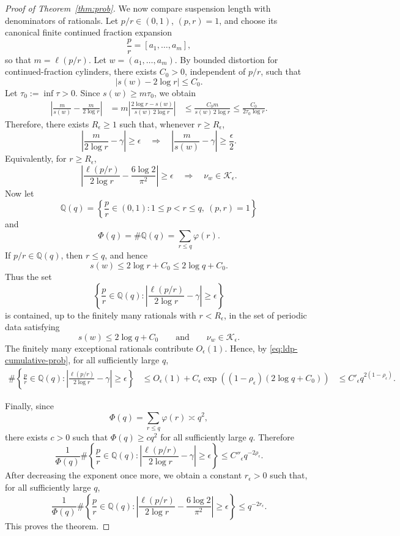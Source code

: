 \documentclass[letterpaper,11pt]{amsart}
\numberwithin{equation}{section}     %
\def\Q{{\mathbb Q}}
\def\le{\leqslant}
\def\ge{\geqslant}
\begin{document}
\begin{proof}[Proof of Theorem~\ref{thm:prob}]
We now compare suspension length with denominators of rationals. Let
\(p/r\in(0,1)\), \((p,r)=1\), and choose its canonical finite continued
fraction expansion
\[
\frac pr=[a_1,\ldots,a_m],
\]
so that \(m=\ell(p/r)\). Let \(w=(a_1,\ldots,a_m)\). By bounded distortion for
continued-fraction cylinders, there exists \(C_0>0\), independent of \(p/r\),
such that
\begin{equation}\label{eq:susp-denom-comparison}
\left|s(w)-2\log r\right|\le C_0 .
\end{equation}
Let $\tau_0:=\inf\tau>0.$ Since $s(w)\ge m\tau_0$, we obtain
\[
\begin{aligned}
\left|
\frac{m}{s(w)}
-
\frac{m}{2\log r}
\right|
&=
m
\left|
\frac{2\log r-s(w)}{s(w)\,2\log r}
\right|  
&\le
\frac{C_0m}{s(w)\,2\log r}
\le
\frac{C_0}{2\tau_0\log r}.
\end{aligned}
\]
Therefore, there exists \(R_\epsilon\ge1\) such that, whenever
\(r\ge R_\epsilon\),
\[
\left|
\frac{m}{2\log r}-\gamma
\right|
\ge \epsilon
\quad\Longrightarrow\quad
\left|
\frac{m}{s(w)}-\gamma
\right|
\ge \frac{\epsilon}{2}.
\]
Equivalently, for \(r\ge R_\epsilon\),
\[
\left|
\frac{\ell(p/r)}{2\log r}
-
\frac{6\log 2}{\pi^2}
\right|
\ge \epsilon
\quad\Longrightarrow\quad
\nu_w\in\mathcal K_\epsilon .
\]
Now let
\[
\Q(q)
=
\left\{
\frac pr\in(0,1):
1\le p<r\le q,\ (p,r)=1
\right\}
\]
and
\[
\Phi(q)=\#\Q(q)=\sum_{r\le q}\varphi(r).
\]
If \(p/r\in\Q(q)\), then \(r\le q\), and hence
\[
s(w)\le 2\log r+C_0\le 2\log q+C_0.
\]
Thus the set
\[
\left\{
\frac pr\in\Q(q):
\left|
\frac{\ell(p/r)}{2\log r}-\gamma
\right|
\ge\epsilon
\right\}
\]
is contained, up to the finitely many rationals with \(r<R_\epsilon\), in the
set of periodic data satisfying
\[
s(w)\le 2\log q+C_0
\qquad\text{and}\qquad
\nu_w\in\mathcal K_\epsilon .
\]
The finitely many exceptional rationals contribute \(O_\epsilon(1)\). Hence,
by \eqref{eq:ldp-cumulative-prob}, for all sufficiently large \(q\),
\[
\begin{aligned}
\#\left\{
\frac pr\in\Q(q):
\left|
\frac{\ell(p/r)}{2\log r}-\gamma
\right|
\ge\epsilon
\right\}
&\le
O_\epsilon(1)
+
C_\epsilon
\exp\left((1-\rho_\epsilon)(2\log q+C_0)\right) 
&\le
C'_\epsilon q^{2(1-\rho_\epsilon)} .
\end{aligned}
\]

Finally, since
\[
\Phi(q)=\sum_{r\le q}\varphi(r)\asymp q^2,
\]
there exists \(c>0\) such that \(\Phi(q)\ge cq^2\) for all sufficiently large
\(q\). Therefore
\[
\frac{1}{\Phi(q)}
\#\left\{
\frac pr\in\Q(q):
\left|
\frac{\ell(p/r)}{2\log r}-\gamma
\right|
\ge\epsilon
\right\}
\le
C''_\epsilon q^{-2\rho_\epsilon}.
\]
After decreasing the exponent once more, we obtain a constant
\(r_\epsilon>0\) such that, for all sufficiently large \(q\),
\[
\frac{1}{\Phi(q)}
\#
\left\{
\frac pr\in\Q(q):
\left|
\frac{\ell(p/r)}{2\log r}
-
\frac{6\log 2}{\pi^2}
\right|
\ge\epsilon
\right\}
\le
q^{-2r_\epsilon}.
\]
This proves the theorem.
\end{proof}
\end{document}
